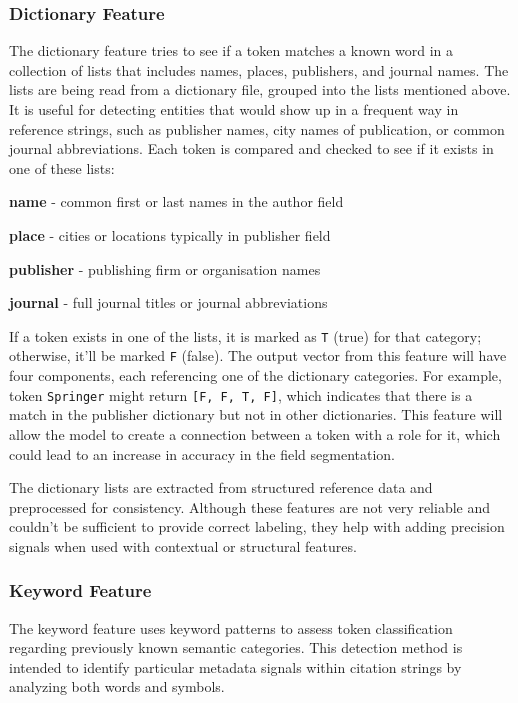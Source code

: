 \subsubsection{Dictionary Feature}
The dictionary feature tries to see if a token matches a known word in a collection of lists that includes names, places, publishers, and journal names. The lists are being read from a dictionary file, grouped into the lists mentioned above. It is useful for detecting entities that would show up in a frequent way in reference strings, such as publisher names, city names of publication, or common journal abbreviations.
Each token is compared and checked to see if it exists in one of these lists:
\begin{compactitem}
\item \textbf{name} - common first or last names in the author field
\item \textbf{place} - cities or locations typically in publisher field
\item \textbf{publisher} - publishing firm or organisation names
\item \textbf{journal} - full journal titles or journal abbreviations
\end{compactitem}
If a token exists in one of the lists, it is marked as \texttt{T} (true) for that category; otherwise, it’ll be marked \texttt{F} (false). The output vector from this feature will have four components, each referencing one of the dictionary categories.
For example, token \texttt{Springer} might return \texttt{[F, F, T, F]}, which indicates that there is a match in the publisher dictionary but not in other dictionaries. This feature will allow the model to create a connection between a token with a role for it, which could lead to an increase in accuracy in the field segmentation.

The dictionary lists are extracted from structured reference data and preprocessed for consistency. Although these features are not very reliable and couldn’t be sufficient to provide correct labeling, they help with adding precision signals when used with contextual or structural features.

\subsubsection{Keyword Feature}
The keyword feature uses keyword patterns to assess token classification regarding previously known semantic categories. This detection method is intended to identify particular metadata signals within citation strings by analyzing both words and symbols.


